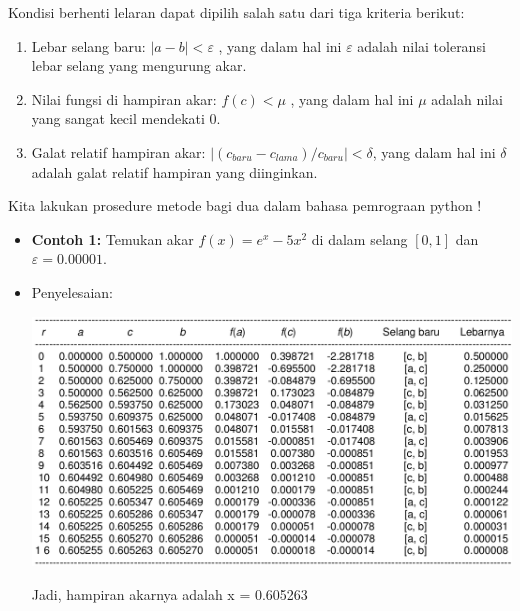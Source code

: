 \documentclass[pdflatex,compress]{beamer}
\begin{document}
\begin{frame}
	Kondisi berhenti lelaran dapat dipilih salah satu dari tiga kriteria berikut:
	\begin{enumerate}
		\item Lebar selang baru: $|a - b| < \varepsilon$ , yang dalam hal ini $\varepsilon$ adalah nilai toleransi lebar selang yang mengurung akar.
		\item Nilai fungsi di hampiran akar: $ f(c) < \mu $ , yang dalam hal ini $\mu$ adalah nilai yang sangat kecil mendekati 0.
		\item Galat relatif hampiran akar: $ |(c_{baru} - c_{lama}) / c_{baru}| < \delta $, yang dalam hal ini $\delta$ adalah galat relatif hampiran yang diinginkan.
	\end{enumerate}
\end{frame}

\begin{frame}
	Kita lakukan prosedure metode bagi dua dalam bahasa pemrograan python !
\end{frame}

\begin{frame}
	\begin{itemize}
		\item \textbf{Contoh 1:} Temukan akar $ f(x) = e^x - 5x^2 $ di dalam selang $ [0, 1] $ dan $ \varepsilon = 0.00001 $.
		\item Penyelesaian:
		\begin{center}
			\includegraphics[width=0.7\linewidth]{img/img07.png}
		\end{center}
		Jadi, hampiran akarnya adalah x = 0.605263
	\end{itemize}
\end{frame}
\end{document}
